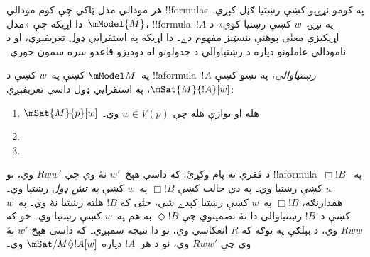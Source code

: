 \documentclass[../../../include/open-logic-section]{subfiles}
\begin{document}


هر مودالي مدل ټاکي چې کوم مودالي !!{formula}s په کومو نړۍو کښې
رښتيا ګڼل کېږي۔ دا اړيکه چې «مدل~$\mModel{M}$، !!{formula}~$!A$
په نړۍ~$w$ کښې رښتيا کوي» د اړيکيزې معنٰی پوهنې بنسټيز مفهوم دے۔
دا اړيکه په استقرايي ډول تعريفېږي، او د نامودالي عاملونو دپاره د
رښتياوالي د جدولونو له دوديزو قاعدو سره سمون خوري۔

\begin{defn}
  په~$\mModel M$ کښې په~$w$ کښې د !!a{formula}~$!A$ \emph{رښتياوالی}،
  په نښو کښې $\mSat{M}{!A}[w]$، په استقرايي ډول داسې تعريفېږي:
  \begin{enumerate}
  \item $\mSat{M}{p}[w]$ هله او يوازې هله چې $w \in V(p)$ وي۔
  \item{}
  \item{}
  \end{enumerate}
\end{defn}

د  فقرې ته پام وکړئ: که داسې هېڅ~$w'$
نۀ وي چې $Rww'$ وي، نو !!a{formula}~$\Box !B$ په~$w$ کښې رښتيا
وي۔ په دې حالت کښې $\Box !B$ په~$w$ کښې \emph{په تش ډول} رښتيا وي۔ همدارنګه،
$\Box !B$ په~$w$ کښې رښتيا کېدے شي، حتٰی که $!B$ هلته رښتيا نۀ
وي۔ په~$w$ کښې د~$!B$ رښتياوالی دا نۀ تضمينوي چې $\Diamond !B$ به
هم په~$w$ کښې رښتيا وي۔ خو که $Rww$ وي، د بېلګې په توګه که $R$
انعکاسي وي، نو دا نتيجه سمېږي۔ که داسې هېڅ $w'$ نۀ وي چې $Rww'$ وي،
نو د هر~$!A$ دپاره $\mSat/{M}{\Diamond !A}[w]$ وي۔
\end{document}
